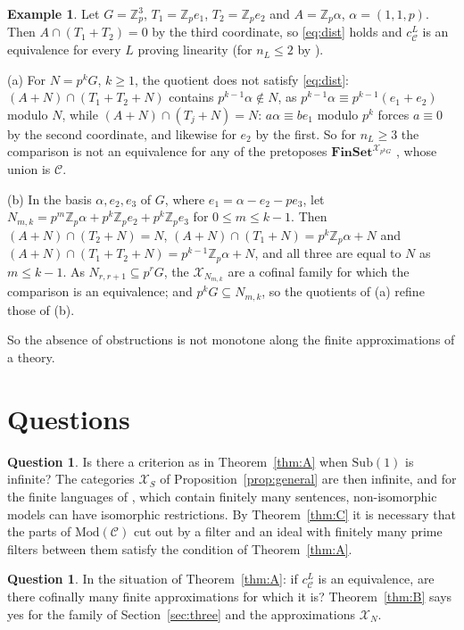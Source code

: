 \documentclass[11pt]{amsart}
\theoremstyle{definition}
\newtheorem{ex}[thm]{Example}
\newtheorem{que}[thm]{Question}
\newcommand{\Fin}{\mathbf{FinSet}}
\newcommand{\Sub}{\mathrm{Sub}}
\newcommand{\Mod}{\mathrm{Mod}}
\newcommand{\cX}{\mathcal X}
\newcommand{\cC}{\mathcal C}
\begin{document}
\begin{ex}\label{ex:Zp}
Let $G=\mathbb Z_p^3$, $T_1=\mathbb Z_pe_1$, $T_2=\mathbb Z_pe_2$ and
$A=\mathbb Z_p\alpha$, $\alpha=(1,1,p)$. Then $A\cap(T_1+T_2)=0$ by
the third coordinate, so \eqref{eq:dist} holds and $c^L_\cC$ is an
equivalence for every $L$ proving linearity (for
$n_L\le2$ by \cite[Thm.~1.1]{Finsorts}).

(a) For $N=p^kG$, $k\ge1$, the quotient does not satisfy
\eqref{eq:dist}: $(A+N)\cap(T_1+T_2+N)$ contains $p^{k-1}\alpha\notin
N$, as $p^{k-1}\alpha\equiv p^{k-1}(e_1+e_2)$ modulo $N$, while
$(A+N)\cap(T_j+N)=N$: $a\alpha\equiv be_1$ modulo $p^k$ forces
$a\equiv0$ by the second coordinate, and likewise for $e_2$ by the
first. So for $n_L\ge3$ the comparison is not an equivalence for any
of the pretoposes $\Fin^{\cX_{p^kG}}$ \cite[Prop.~6.11]{Strings},
whose union is $\cC$.

(b) In the basis $\alpha,e_2,e_3$ of $G$, where $e_1=\alpha-e_2-pe_3$,
let $N_{m,k}=p^m\mathbb Z_p\alpha+p^k\mathbb Z_pe_2+p^k\mathbb
Z_pe_3$ for $0\le m\le k-1$. Then $(A+N)\cap(T_2+N)=N$,
$(A+N)\cap(T_1+N)=p^k\mathbb Z_p\alpha+N$ and
$(A+N)\cap(T_1+T_2+N)=p^{k-1}\mathbb Z_p\alpha+N$, and all three are
equal to $N$ as $m\le k-1$. As $N_{r,r+1}\subseteq p^rG$, the $\cX_{N_{m,k}}$ are a cofinal
family for which the comparison is an equivalence; and $p^kG\subseteq
N_{m,k}$, so the quotients of (a) refine those of (b).
\end{ex}

So the absence of obstructions is not monotone along the finite
approximations of a theory.

\section{Questions}

\begin{que}
Is there a criterion as in Theorem~\ref{thm:A} when $\Sub(1)$ is
infinite? The categories $\cX_S$ of Proposition~\ref{prop:general} are then
infinite, and for the finite languages of \cite[\S5]{Finsorts}, which
contain finitely many sentences, non-isomorphic models can have
isomorphic restrictions. By Theorem~\ref{thm:C} it is necessary that
the parts of $\Mod(\cC)$ cut out by a filter and an ideal with
finitely many prime filters between them satisfy the condition of
Theorem~\ref{thm:A}.
\end{que}

\begin{que}
In the situation of Theorem~\ref{thm:A}: if $c^L_\cC$ is an
equivalence, are there cofinally many finite approximations for which
it is? Theorem~\ref{thm:B} says yes for the family of
Section~\ref{sec:three} and the approximations $\cX_N$.
\end{que}
\end{document}
